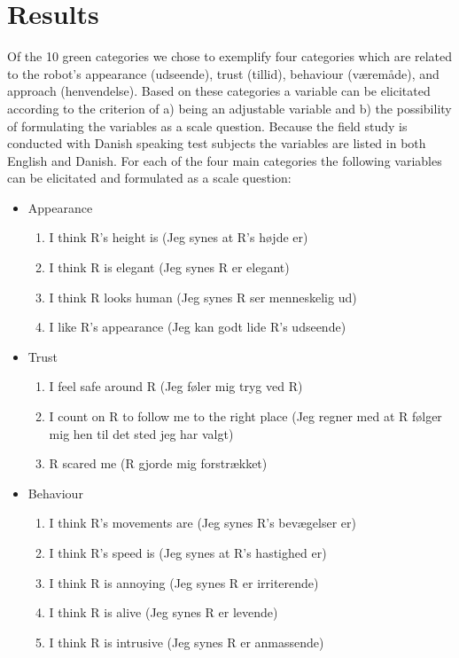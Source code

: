\section{Results}
\label{Results}
%
Of the 10 green categories we chose to exemplify four categories which are related to the robot’s appearance (udseende), trust (tillid), behaviour (væremåde), and approach (henvendelse). Based on these categories a variable can be elicitated according to the criterion of a) being an adjustable variable and b) the possibility of formulating the variables as a scale question. Because the field study is conducted with Danish speaking test subjects the variables are listed in both English and Danish. For each of the four main categories the following variables can be elicitated and formulated as a scale question:\\
%
\begin{itemize}
\item Appearance
\begin{enumerate}
  \item I think R's height is (Jeg synes at R's højde er)
  \item I think R is elegant (Jeg synes R er elegant)
  \item I think R looks human (Jeg synes R ser menneskelig ud)
  \item I like R's appearance (Jeg kan godt lide R's udseende)\\
\end{enumerate}
\item Trust 
\begin{enumerate}
  \item I feel safe around R (Jeg føler mig tryg ved R)
  \item I count on R to follow me to the right place (Jeg regner med at R følger mig hen til det sted jeg har valgt)
  \item R scared me (R gjorde mig forstrækket)\\
\end{enumerate}
\item Behaviour
\begin{enumerate}
  \item I think R's movements are (Jeg synes R's bevægelser er)
  \item I think R's speed is (Jeg synes at R's hastighed er)
  \item I think R is annoying (Jeg synes R er irriterende)
  \item I think R is alive (Jeg synes R er levende)
  \item I think R is intrusive (Jeg synes R er anmassende)\\

\end{enumerate}
\end{itemize}
